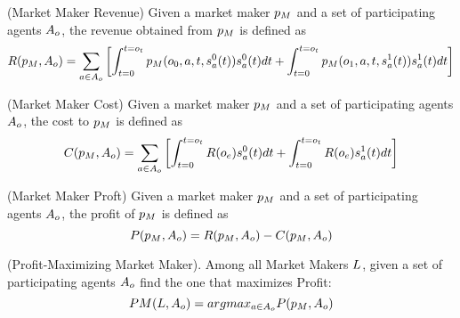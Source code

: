   \begin{definition} (Market Maker Revenue)
  \label{def:mmr}
   Given a market maker $p_M$ and a set of participating agents
   $A_o$, the revenue obtained from $p_M$ is defined as
     $$R(p_M, A_o) = 
      \sum_{a\in A_o} \left[
	\int_{t = 0}^{t = o_t} 
	  p_M(o_0,a,t, s^{0}_{a}(t))s^{0}_{a}(t)dt
	  + \int_{t = 0}^{t = o_t} 
	  p_M(o_1,a,t, s^{1}_{a}(t))s^{1}_{a}(t)dt\right]$$
  \end{definition}
  
    \begin{definition} (Market Maker Cost)
  \label{def:mmc}
   Given a market maker $p_M$ and a set of participating agents
   $A_o$, the cost to $p_M$ is defined as
     $$ C(p_M, A_o) =
     \sum_{a\in A_o} \left[
	\int_{t = 0}^{t = o_t} 
	R(o_e)s^{0}_{a}(t)dt
	+\int_{t = 0}^{t = o_t} 
	R(o_e)s^{1}_{a}(t)dt
	\right]$$
  \end{definition}

      \begin{definition} (Market Maker Proft)
  \label{def:mmf}
   Given a market maker $p_M$ and a set of participating agents
   $A_o$, the profit of $p_M$ is defined as
     $$ P(p_M, A_o) = R(p_M, A_o) 
     - C(p_M, A_o)$$
  \end{definition}
  
\begin{definition} (Profit-Maximizing Market Maker).
\label{def:pmmm}
Among all Market Makers $L$, given a set of participating agents $A_o$ find the one that maximizes Profit:
$$ PM(L, A_o) = arg max_{a \in A_o} P(p_M, A_o)$$
\end{definition}


